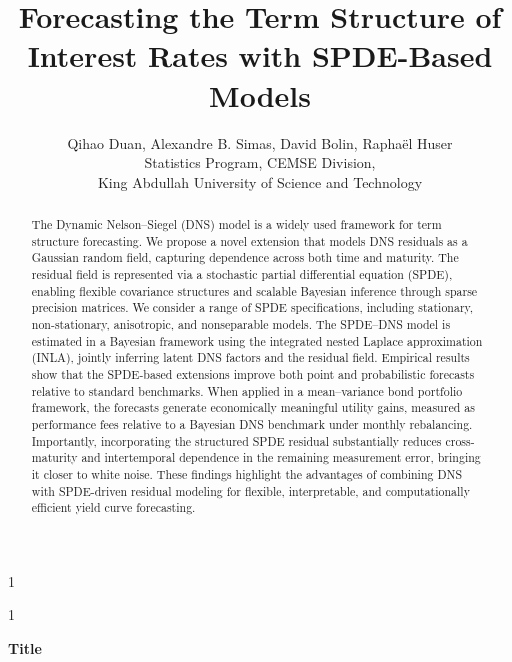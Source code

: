 \documentclass[
  12pt]{article}
\newcommand{\anon}{1}
\begin{document}
\def\spacingset#1{\renewcommand{\baselinestretch}%
{#1}\small\normalsize} \spacingset{1}




\anon
{
  \title{\bf Forecasting the Term Structure of Interest Rates with SPDE-Based Models}
  \author{Qihao Duan, Alexandre B. Simas, David Bolin, Rapha\"el Huser \hspace{.2cm}\\
    Statistics Program, CEMSE Division, \\ King Abdullah University of Science and Technology}
  \maketitle
} \fi

\anon
{
  \bigskip
  \bigskip
  \bigskip
  \begin{center}
    {\LARGE\bf Title}
\end{center}
  \medskip
} \fi

\bigskip
\begin{abstract}
The Dynamic Nelson--Siegel (DNS) model is a widely used framework for term structure forecasting. We propose a novel extension that models DNS residuals as a Gaussian random field, capturing dependence across both time and maturity. The residual field is represented via a stochastic partial differential equation (SPDE), enabling flexible covariance structures and scalable Bayesian inference through sparse precision matrices. We consider a range of SPDE specifications, including stationary, non-stationary, anisotropic, and nonseparable models. The SPDE--DNS model is estimated in a Bayesian framework using the integrated nested Laplace approximation (INLA), jointly inferring latent DNS factors and the residual field. Empirical results show that the SPDE-based extensions improve both point and probabilistic forecasts relative to standard benchmarks. When applied in a mean--variance bond portfolio framework, the forecasts generate economically meaningful utility gains, measured as performance fees relative to a Bayesian DNS benchmark under monthly rebalancing. Importantly, incorporating the structured SPDE residual substantially reduces cross-maturity and intertemporal dependence in the remaining measurement error, bringing it closer to white noise. These findings highlight the advantages of combining DNS with SPDE-driven residual modeling for flexible, interpretable, and computationally efficient yield curve forecasting.
\end{abstract}
\end{document}
